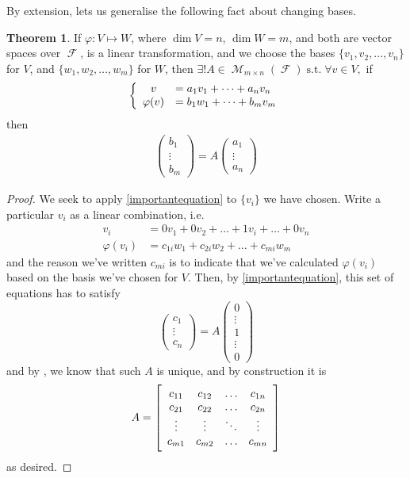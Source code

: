 \documentclass[11pt]{amsart} %
\theoremstyle{definition}
\newtheorem{theorem}[definition]{Theorem}
\theoremstyle{definition}
\DeclareMathOperator{\FF}{\mathcal{F}}
\DeclareMathOperator{\suchthat}{\text{ s.t. }}
\DeclareMathOperator{\Ma}{\mathcal{M}}
\numberwithin{equation}{section}
\begin{document}
By extension,  lets us generalise the following fact about changing bases.

\begin{theorem}
	\label{thmChangeOfBases}
	If $\varphi: V \mapsto W$, where $\dim V = n$, $\dim W=m$, and both are vector spaces over $\FF$, is a linear transformation, and we choose the bases $\{ v_1, v_2, \dots, v_n \}$ for $V$, and $\{ w_1,w_2,\dots,w_m \}$ for $W$, then $\exists! A \in \Ma_{m \times n} (\FF) \suchthat \forall v \in V,$ if
	$$\left\{  \begin{array}{c l}
	v & = a_1 v_1 + \dots + a_n v_n \\
	\varphi (v) &= b_1 w_1 + \dots + b_m v_m
	\end{array}  \right.$$
	then
	\begin{align*}
	\label{importantequation}
	\tag{$\star$}
	\left( \begin{array}{c } b_1 \\ \vdots \\ b_m \end{array} \right) = A \left( \begin{array}{c } a_1 \\ \vdots \\ a_n \end{array} \right) 
	\end{align*}
\end{theorem}

\begin{proof}
	We seek to apply \eqref{importantequation} to $\{v_i\}$ we have chosen. Write a particular $v_i$ as a linear combination, i.e.
	\begin{align*}
	v_i  &= 0 v_1 + 0 v_2 + \dots + 1 v_i + \dots + 0 v_n \\
	\varphi (v_i)  &= c_{1i} w_1 + c_{2i} w_2 + \dots  + c_{mi} w_m	
	\end{align*}
	and the reason we've written $c_{mi}$ is to indicate that we've calculated $\varphi(v_i)$ based on the basis we've chosen for $V$. Then, by \eqref{importantequation}, this set of equations has to satisfy
	$$ 	\left( \begin{array}{c } c_1 \\ \vdots \\ c_n \end{array} \right) = A \left( \begin{array}{c } 0 \\ \vdots \\ 1 \\ \vdots \\ 0 \end{array} \right)  $$
	and by , we know that such $A$ is unique, and by construction it is
	$$ A = \left[ \begin{array}{c c c c}
	c_{11} & c_{12} &\dots & c_{1n } \\
	c_{21} & c_{22} & \dots & c_{2n } \\	
	\vdots & \vdots & \ddots & \vdots \\	
	c_{m1} & c_{m2} & \dots & c_{mn } \\
	\end{array} \right] $$
	as desired.
\end{proof}
\end{document}
